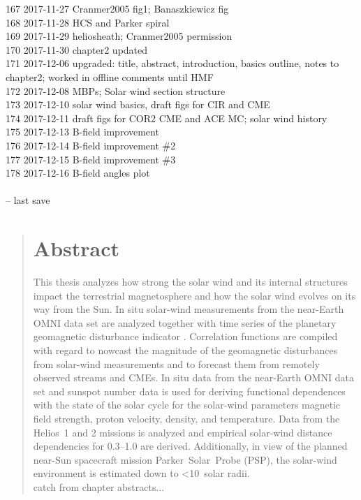 \begin{footnotesize}
167	2017-11-27	Cranmer2005 fig1; Banaszkiewicz fig\\
168	2017-11-28	HCS and Parker spiral\\
169	2017-11-29	heliosheath; Cranmer2005 permission\\
170	2017-11-30	chapter2 updated\\
171	2017-12-06	upgraded: title, abstract, introduction, basics outline, notes to chapter2; worked in offline comments until HMF\\
172	2017-12-08	MBPs; Solar wind section structure\\
173	2017-12-10	solar wind basics, draft figs for CIR and CME\\
174	2017-12-11	draft figs for COR2 CME and ACE MC; solar wind history\\
175	2017-12-13	B-field improvement\\
176	2017-12-14	B-field improvement \#2\\
177	2017-12-15	B-field improvement \#3\\
178	2017-12-16	B-field angles plot\\
\\
\ISOToday{} \thistime{} -- last save
\end{footnotesize}

\newpage

\begin{abstract}
\section*{Abstract}
This thesis analyzes how strong the solar wind and its internal structures impact the terrestrial magnetosphere and how the solar wind evolves on its way from the Sun.
In situ solar-wind measurements from the near-Earth OMNI data set are analyzed together with time series of the planetary geomagnetic disturbance indicator \Kp{}. Correlation functions are compiled with regard to nowcast the magnitude of the geomagnetic disturbances from solar-wind measurements and to forecast them from remotely observed streams and CMEs.
In situ data from the near-Earth OMNI data set and sunspot number data is used for deriving functional dependences with the state of the solar cycle for the solar-wind parameters magnetic field strength, proton velocity, density, and temperature.
Data from the Helios~1 and 2 missions is analyzed and empirical solar-wind distance dependencies for \SIrange{0.3}{1.0}{\au} are derived. Additionally, in view of the planned near-Sun spacecraft mission Parker~Solar~Probe (PSP), the solar-wind environment is estimated down to \num{<10}~solar radii.\\

catch from chapter abstracts...\\

\end{abstract}

{\let\cleardoublepage\clearpage\tableofcontents}	%
\label{toc}

